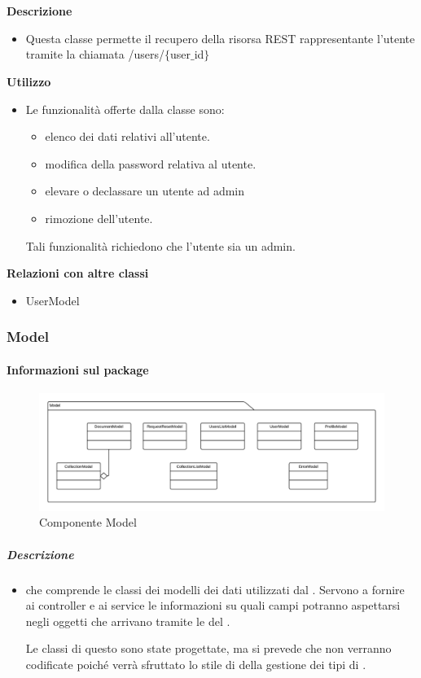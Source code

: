         \textbf{\\ \\ Descrizione} 
          \begin{itemize}
            \item[] Questa classe permette il recupero della risorsa REST rappresentante l'utente tramite la chiamata /users/$\{$user$\_$id$\}$
          \end{itemize}      
        \textbf{Utilizzo}  
          \begin{itemize}
            \item[] Le funzionalità offerte dalla classe sono: 
\begin{itemize} 
\item elenco dei dati relativi all'utente. 
\item modifica della password relativa al utente.
\item elevare o declassare un utente ad admin 
\item rimozione dell'utente.
\end{itemize}
Tali funzionalità richiedono che l'utente sia un admin.
          \end{itemize}
          \textbf{Relazioni con altre classi}
          \begin{itemize}
              \item{UserModel}
          \end{itemize}
  \subsubsection{Model}
  \paragraph{Informazioni sul package}
    \begin{figure}[H] 
      \begin{center}
        \includegraphics[width=\textwidth]{uml/package/Front-end::Model.png}
        \caption{Componente Model}
      \end{center}  
    \end{figure} 
  \subparagraph{Descrizione} 
    \begin{itemize}
    \item[]  che comprende le classi dei modelli dei dati utilizzati dal . Servono a fornire ai controller e ai service le informazioni su quali campi potranno aspettarsi negli oggetti che arrivano tramite le  del .

Le classi di questo  sono state progettate, ma si prevede che non verranno codificate poiché verrà sfruttato lo stile di  della gestione dei tipi di .
    \end{itemize} 
